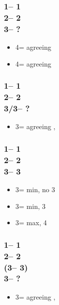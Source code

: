 \documentclass[12pt, a4paper]{article}
\begin{document}
\subsubsection*{1\hearts -- 1\spades\\
                2\hearts -- 2\nt\\
                3\spades -- ?}
\begin{itemize}
    \item 4\clubs = agreeing \hearts
    \item 4\diams = agreeing \spades
\end{itemize}

\subsubsection*{1\hearts -- 1\spades\\
                2\hearts -- 2\nt\\
                3\clubs/3\diams -- ?}
\begin{itemize}
    \item 3\spades = agreeing \spades, \gf
\end{itemize}

\subsubsection*{1\hearts -- 1\spades\\
                2\hearts -- 2\nt\\
                3\clubs -- 3\diams}
\begin{itemize}
    \item 3\hearts = min, no 3\spades
    \item 3\spades = min, 3\spades
    \item 3\nt = max, 4\clubs
\end{itemize}

\subsubsection*{1\hearts -- 1\spades\\
                2\hearts -- 2\nt\\
                (3\clubs -- 3\diams)\\
                3\hearts -- ?}
\begin{itemize}
    \item 3\spades = agreeing \hearts, \lsf
\end{itemize}


\end{document}
